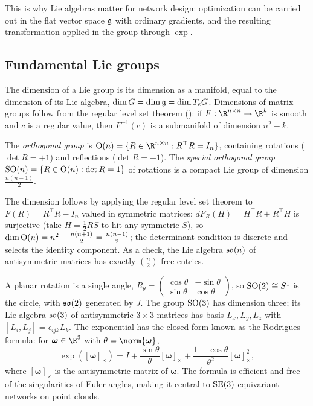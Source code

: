 This is why Lie algebras matter for network design: optimization can be carried
out in the flat vector space $\mathfrak{g}$ with ordinary gradients, and the resulting
transformation applied in the group through $\exp$.

\subsection{Fundamental Lie groups}
\label{sec:found:fundamental-groups}

The dimension of a Lie group is its dimension as a manifold, equal to the
dimension of its Lie algebra, $\dim G = \dim\mathfrak{g} = \dim T_e G$. Dimensions of
matrix groups follow from the regular level set theorem (): if
$F : \R^{n\times n} \to \R^k$ is smooth and $c$ is a regular value, then
$F^{-1}(c)$ is a submanifold of dimension $n^2 - k$.

\begin{definition}
\label{def:found:orthogonal}
The \emph{orthogonal group} is $\Orth(n) = \{R \in \R^{n\times n} : R^\top R =
I_n\}$, containing rotations ($\det R = +1$) and reflections ($\det R = -1$). The
\emph{special orthogonal group} $\operatorname{SO}(n) = \{R \in \operatorname{O}(n) : \det R = 1\}$ of
rotations is a compact Lie group of dimension $\frac{n(n-1)}{2}$.
\end{definition}

The dimension follows by applying the regular level set theorem to
$F(R) = R^\top R - I_n$ valued in symmetric matrices: $dF_R(H) = H^\top R +
R^\top H$ is surjective (take $H = \frac12 RS$ to hit any symmetric $S$), so
$\dim\operatorname{O}(n) = n^2 - \frac{n(n+1)}{2} = \frac{n(n-1)}{2}$; the determinant
condition is discrete and selects the identity component. As a check, the Lie
algebra $\mathfrak{so}(n)$ of antisymmetric matrices has exactly $\binom{n}{2}$ free
entries.

\begin{example}[$\SO(2)$ and $\SO(3)$]
\label{ex:found:so2-so3}
A planar rotation is a single angle,
$R_\theta = \left(\begin{smallmatrix}\cos\theta & -\sin\theta\\ \sin\theta &
\cos\theta\end{smallmatrix}\right)$, so $\operatorname{SO}(2) \cong S^1$ is the circle, with
$\mathfrak{so}(2)$ generated by $J$. The group $\SO(3)$ has dimension three; its Lie
algebra $\mathfrak{so}(3)$ of antisymmetric $3\times 3$ matrices has basis
$L_x, L_y, L_z$ with $[L_i, L_j] = \epsilon_{ijk} L_k$. The exponential has the
closed form known as the Rodrigues formula: for $\boldsymbol{\omega} \in \R^3$
with $\theta = \norm{\boldsymbol{\omega}}$,
\[
  \exp([\boldsymbol{\omega}]_\times) = I + \frac{\sin\theta}{\theta}
  [\boldsymbol{\omega}]_\times + \frac{1-\cos\theta}{\theta^2}
  [\boldsymbol{\omega}]_\times^2,
\]
where $[\boldsymbol{\omega}]_\times$ is the antisymmetric matrix of
$\boldsymbol{\omega}$. The formula is efficient and free of the singularities of
Euler angles, making it central to $\operatorname{SE}(3)$-equivariant networks on point
clouds.
\end{example}

